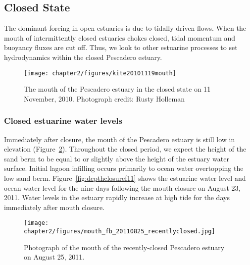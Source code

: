\subsection{Closed State} \label{ssec:ClosedDynamics}

The dominant forcing in open estuaries is due to tidally driven flows. When the mouth of intermittently closed estuaries chokes closed, tidal momentum and buoyancy fluxes are cut off. Thus, we look to other estuarine processes to set hydrodynamics within the closed Pescadero estuary. 

\begin{figure}
	\begin{center}
		\texttt{[image: chapter2/figures/kite20101119mouth]} 
	\end{center}
\caption{The mouth of the Pescadero estuary in the closed state on 11 November, 2010.  Photograph credit: Rusty Holleman}\label{fig:kite_photos_closed} \end{figure}



\subsubsection{Closed estuarine water levels} \label{cl_wl}
Immediately after closure, the mouth of the Pescadero estuary is still low in elevation (Figure~\ref{fig:mouth_fb_20110825}). Throughout the closed period, we expect the height of the sand berm to be equal to or slightly above the height of the estuary water surface. Initial lagoon infilling occurs primarily to ocean water overtopping the low sand berm. Figure~\ref{fig:depthclosuref11} shows the estuarine water level and ocean water level for the nine days following the mouth closure on August 23, 2011. Water levels in the estuary rapidly increase at high tide for the days immediately after mouth closure.  


\begin{figure}
\centering
		\texttt{[image: chapter2/figures/mouth\_fb\_20110825\_recentlyclosed.jpg]} \caption{Photograph of the mouth of the recently-closed Pescadero estuary on August 25, 2011.} \label{fig:mouth_fb_20110825}
\end{figure}



